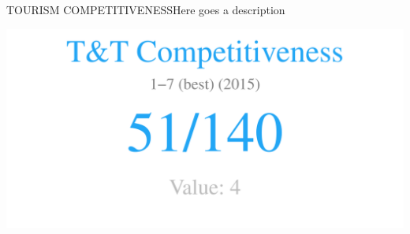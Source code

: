 \documentclass{article}\usepackage[]{graphicx}\usepackage[]{color}
\makeatletter
\def\maxwidth{ %
  \ifdim\Gin@nat@width>\linewidth
    \linewidth
  \else
    \Gin@nat@width
  \fi
}
\makeatother
\begin{document}
\begin{minipage}[c]{0.95\textwidth}
  \vspace{5ex}
  \begin{flushleft}  
    \hspace{4ex}\Large{\textcolor[HTML]{722FF5}{TOURISM COMPETITIVENESS}}\hspace{2ex}\small{\textcolor[HTML]{818181}{Here goes a description}}
  \end{flushleft}
  \begin{minipage}[c]{0.45\textwidth}
    \hspace{4ex}\small{\textcolor[HTML]{818181}{}}
    \vspace{1ex}


\hfill{}\includegraphics[width=\maxwidth]{figure/numberBig-1} 




\end{minipage}
\end{minipage}
\end{document}

